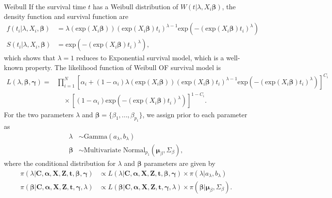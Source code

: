 \documentclass[a4paper, 12pt]{article}
\makeatletter
\renewcommand{\subsection}{\@startsection
	{subsection}    {2}    {0mm}    {-0.5\baselineskip}    {0.01\baselineskip}    {\normalfont\normalsize\itshape\center}}
\makeatother
\begin{document}
\subsection{Weibull}
\noindent 
If the survival time $t$ has a Weibull distribution of $W(t|\lambda, X_i\mathbf{\beta})$, the density function and survival function are
\begin{equation}
\begin{aligned}
f(t_i|\lambda, X_i, \mathbf{\beta}) &= \lambda(\mbox{exp}(X_i\mathbf{\beta})) (\mbox{exp}(X_i\mathbf{\beta})t_i)^{\lambda - 1} \mbox{exp}(-(\mbox{exp}(X_i\mathbf{\beta})t_i)^{\lambda})\\
S(t_i|\lambda, X_i, \mathbf{\beta}) &= \mbox{exp}(-(\mbox{exp}(X_i\mathbf{\beta})t_i)^{\lambda}),
\end{aligned}
\end{equation}
which shows that $\lambda=1$ reduces to Exponential survival model, which is a well-known property. The likelihood function of Weibull OF survival model is
\begin{equation}
\begin{aligned}
L(\lambda, \mathbf{\beta}, \mathbf{\gamma})=&\prod\limits_{i=1}^{N}[\alpha _{i}+(1-\alpha _{i})\lambda(\mbox{exp}(X_i\mathbf{\beta})) (\mbox{exp}(X_i\mathbf{\beta})t_i)^{\lambda - 1} \mbox{exp}(-(\mbox{exp}(X_i\mathbf{\beta})t_i)^{\lambda})]^{C_{i}}\\&\quad\times [(1-\alpha _{i})\mbox{exp}(-(\mbox{exp}(X_i\mathbf{\beta})t_i)^{\lambda})]^{1-C_{i}}.
\end{aligned}
\end{equation}
For the two parameters $\lambda$ and $\mathbf{\beta}=\{\beta_1,...,\beta_{p_1}\}$, we assign prior to each parameter as
\begin{equation}
\begin{aligned}
\lambda &\sim \mbox{Gamma}(a_{\lambda}, b_{\lambda})\\
\mathbf{\beta} &\sim \mbox{Multivariate Normal}_{p_1}(\mathbf{\mu}_{\beta}, \Sigma_{\beta}),
\end{aligned}
\end{equation}
where the conditional distribution for $\lambda$ and $\mathbf{\beta}$ parameters are given by
\begin{equation}
\begin{aligned}
\pi(\lambda|\mathbf{C}, \mathbf{\alpha}, \mathbf{X}, \mathbf{Z}, \mathbf{t}, \mathbf{\beta}, \mathbf{\gamma}) &\propto L(\lambda|\mathbf{C}, \mathbf{\alpha}, \mathbf{X}, \mathbf{Z}, \mathbf{t}, \mathbf{\beta}, \mathbf{\gamma})\times \pi(\lambda|a_{\lambda}, b_{\lambda})\\
\pi(\mathbf{\beta}|\mathbf{C}, \mathbf{\alpha}, \mathbf{X}, \mathbf{Z}, \mathbf{t}, \mathbf{\gamma}, \lambda) &\propto L(\mathbf{\beta}|\mathbf{C}, \mathbf{\alpha}, \mathbf{X}, \mathbf{Z}, \mathbf{t}, \mathbf{\gamma}, \lambda)\times \pi(\mathbf{\beta}|\mathbf{\mu}_{\beta}, \Sigma_{\beta}).
\end{aligned}
\end{equation}
\end{document}
